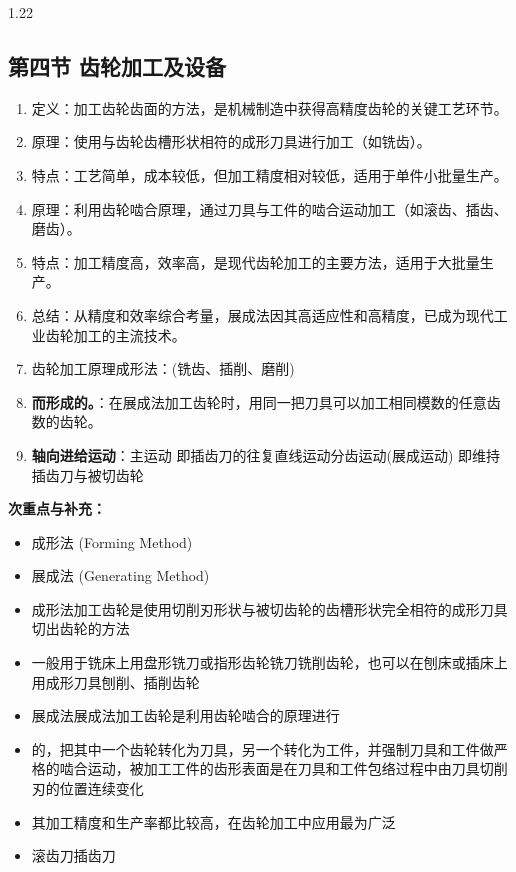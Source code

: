 \documentclass[12pt,a4paper]{article}
\begin{document}
\begin{spacing}{1.22}
\subsection{第四节 齿轮加工及设备}
\begin{tcolorbox}[colback=yellow!6,colframe=red!55!black,title=重点,left=1mm,right=1mm]
\begin{enumerate}[leftmargin=2.2em,label=\arabic*.]
  \item 定义：加工齿轮齿面的方法，是机械制造中获得高精度齿轮的关键工艺环节。
  \item 原理：使用与齿轮齿槽形状相符的成形刀具进行加工（如铣齿）。
  \item 特点：工艺简单，成本较低，但加工精度相对较低，适用于单件小批量生产。
  \item 原理：利用齿轮啮合原理，通过刀具与工件的啮合运动加工（如滚齿、插齿、磨齿）。
  \item 特点：加工精度高，效率高，是现代齿轮加工的主要方法，适用于大批量生产。
  \item 总结：从精度和效率综合考量，展成法因其高适应性和高精度，已成为现代工业齿轮加工的主流技术。
  \item 齿轮加工原理成形法：(铣齿、插削、磨削)
  \item \textbf{而形成的。}：在展成法加工齿轮时，用同一把刀具可以加工相同模数的任意齿数的齿轮。
  \item \textbf{轴向进给运动}：主运动 即插齿刀的往复直线运动分齿运动(展成运动) 即维持插齿刀与被切齿轮
\end{enumerate}
\end{tcolorbox}
\noindent\textbf{次重点与补充：}
\begin{itemize}[leftmargin=2.2em,label=--]
  \item 成形法 (Forming Method)
  \item 展成法 (Generating Method)
  \item 成形法加工齿轮是使用切削刃形状与被切齿轮的齿槽形状完全相符的成形刀具切出齿轮的方法
  \item 一般用于铣床上用盘形铣刀或指形齿轮铣刀铣削齿轮，也可以在刨床或插床上用成形刀具刨削、插削齿轮
  \item 展成法展成法加工齿轮是利用齿轮啮合的原理进行
  \item 的，把其中一个齿轮转化为刀具，另一个转化为工件，并强制刀具和工件做严格的啮合运动，被加工工件的齿形表面是在刀具和工件包络过程中由刀具切削刃的位置连续变化
  \item 其加工精度和生产率都比较高，在齿轮加工中应用最为广泛
  \item 滚齿刀插齿刀

\end{itemize}
\end{spacing}
\end{document}
